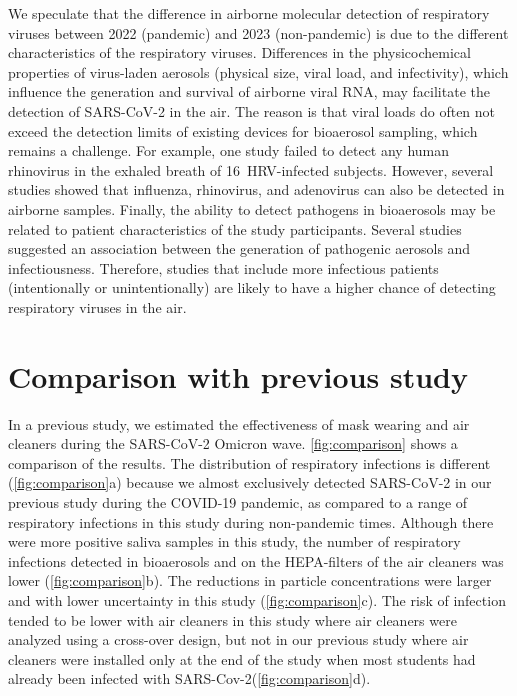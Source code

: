 \documentclass[fleqn,11pt]{wlscirep}
\begin{document}
We speculate that the difference in airborne molecular detection of respiratory viruses between 2022 (pandemic) and 2023 (non-pandemic) is due to the different characteristics of the respiratory viruses. Differences in the physicochemical properties of virus-laden aerosols (\eg physical size, viral load, and infectivity), which influence the generation and survival of airborne viral RNA\cite{Wang2021,Sattar2016Book}, may facilitate the detection of SARS-CoV-2 in the air. The reason is that viral loads do often not exceed the detection limits of existing devices for bioaerosol sampling, which remains a challenge\cite{Wang2021,Belser2023PLOSPath,Bekking2019IORV,Mainelis2020AST}. For example, one study failed to detect any human rhinovirus in the exhaled breath of 16~HRV-infected subjects\cite{Fabian2011JAMPDD}. However, several studies showed that influenza\cite{Bischoff2013JID,Pan2017mSphere}, rhinovirus\cite{Myatt2004AJRCCM}, and adenovirus\cite{Nguyen2017OFID,Pan2017mSphere} can also be detected in airborne samples. Finally, the ability to detect pathogens in bioaerosols may be related to patient characteristics of the study participants. Several studies suggested an association between the generation of pathogenic aerosols and infectiousness\cite{Leung2020NatMed,Bischoff2013JID,Escombe2008PLoSMed}. Therefore, studies that include more infectious patients (intentionally or unintentionally) are likely to have a higher chance of detecting respiratory viruses in the air. 


\section{Comparison with previous study}\label{sec:comparison-prev-study}


In a previous study\cite{Banholzer2023PLoSMed}, we estimated the effectiveness of mask wearing and air cleaners during the SARS-CoV-2 Omicron wave. \cref{fig:comparison} shows a comparison of the results. The distribution of respiratory infections is different (\cref{fig:comparison}a) because we almost exclusively detected SARS-CoV-2 in our previous study during the COVID-19 pandemic, as compared to a range of respiratory infections in this study during non-pandemic times. Although there were more positive saliva samples in this study, the number of respiratory infections detected in bioaerosols and on the HEPA-filters of the air cleaners was lower (\cref{fig:comparison}b).
The reductions in particle concentrations were larger and with lower uncertainty in this study (\cref{fig:comparison}c). The risk of infection tended to be lower with air cleaners in this study where air cleaners were analyzed using a cross-over design, but not in our previous study where air cleaners were installed only at the end of the study when most students had already been infected with SARS-Cov-2(\cref{fig:comparison}d).
\end{document}
